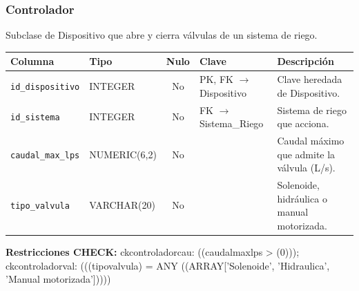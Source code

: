 \documentclass[11pt,letterpaper]{article}
\newcommand{\tbus}{\textunderscore\allowbreak}
\newcommand{\tb}[1]{{\ttfamily\let\_\tbus #1}}
\begin{document}
\subsubsection*{Controlador}
Subclase de Dispositivo que abre y cierra válvulas de un sistema de riego.
{\footnotesize
\begin{longtable}{>{\raggedright\arraybackslash}p{3.3cm}>{\raggedright\arraybackslash}p{2.5cm}c>{\raggedright\arraybackslash}p{2.2cm}>{\raggedright\arraybackslash}p{6.1cm}}
\toprule
\textbf{Columna} & \textbf{Tipo} & \textbf{Nulo} & \textbf{Clave} & \textbf{Descripción} \\
\midrule
\endhead
\texttt{id\_dispositivo} & INTEGER & No & PK, FK $\to$ Dispositivo & Clave heredada de Dispositivo. \\
\texttt{id\_sistema} & INTEGER & No & FK $\to$ Sistema\_Riego & Sistema de riego que acciona. \\
\texttt{caudal\_max\_lps} & NUMERIC(6,2) & No &  & Caudal máximo que admite la válvula (L/s). \\
\texttt{tipo\_valvula} & VARCHAR(20) & No &  & Solenoide, hidráulica o manual motorizada. \\
\bottomrule
\end{longtable}}
{\footnotesize\textbf{Restricciones CHECK:} \tb{ck\_controlador\_cau}: \tb{((caudal\_max\_lps > (0)))}; \tb{ck\_controlador\_val}: \tb{(((tipo\_valvula) = ANY ((ARRAY['Solenoide', 'Hidraulica', 'Manual motorizada']))))}\par}
\medskip
\end{document}

